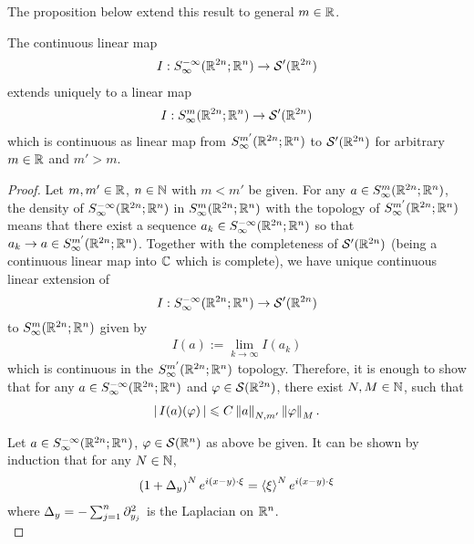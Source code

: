 \documentclass[12pt]{article}
\begin{document}
The proposition below extend this result to general $m \in \R$. 
\begin{fprop} \label{prop : quantisation of all order}
    The continuous linear map 
    \begin{align*}
        I : S^{-\infty}_\infty(\R^{2n}; \R^n) \to \sch'(\R^{2n}) \\
    \end{align*}
    extends uniquely to a linear map 
    \begin{align*}
        I: S^{m}_\infty(\R^{2n}; \R^n) \to \sch'(\R^{2n})
    \end{align*}
    which is continuous as linear map from $S^{m'}_\infty(\R^{2n}; \R^n)$ to $\sch'(\R^{2n})$ for arbitrary $m \in \R$ and $m ' > m$. 
\end{fprop}
\begin{proof}
    Let $m, m' \in \R$, $n \in \N$ with $m < m' $ be given. For any $a \in S^{m}_\infty(\R^{2n}; \R^n)$, the density of $S^{-\infty}_\infty(\R^{2n}; \R^n)$ in  $S^{m}_\infty(\R^{2n}; \R^n)$ with the topology of $S^{m'}_\infty(\R^{2n}; \R^n)$ means that there exist a sequence $a_k \in S^{-\infty}_\infty(\R^{2n}; \R^n)$ so that $a_k \to a \in S^{m'}_\infty(\R^{2n}; \R^n)$. Together with the completeness of $\sch'(\R^{2n})$ (being a continuous linear map into $\C$ which is complete), we have unique continuous linear extension of $$I : S^{-\infty}_\infty(\R^{2n}; \R^n) \to \sch'(\R^{2n})$$ to $S^{m}_\infty(\R^{2n}; \R^n)$ given by
    \begin{align*}
        I(a) := \lim_{k \to \infty}I(a_k)
    \end{align*}
    which is continuous in the $S^{m'}_\infty(\R^{2n}; \R^n)$ topology. Therefore, it is enough to show that for any $a \in S^{-\infty}_\infty(\R^{2n}; \R^n) $ and $\varphi \in \sch(\R^{2n})$, there exist $N, M \in \N$, such that 
    \begin{align*}
        \abs{I(a)(\varphi)} \leq C \norm[a]_{N, m'} \norm[\varphi]_M. 
    \end{align*}
    
    Let $a \in S^{-\infty}_{\infty}(\R^{2n}; \R^{n})$, $\varphi \in \sch(\R^n)$ as above be given. It can be shown by induction that for any $N \in \N$,  
    \begin{align*}
    \brac{1 + \Delta_y}^N e^{i (x - y) \cdot \xi} = \sym[\xi]^{N}e^{i (x - y) \cdot \xi}
    \end{align*}
    where $\Delta_y = - \sum_{j = 1}^n \p_{y_j}^2$ is the Laplacian on $\R^n$. \\


\end{proof}
\end{document}
